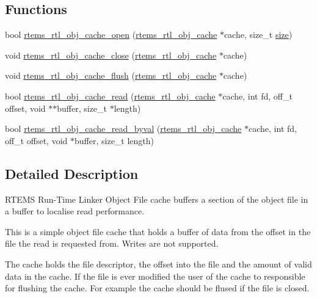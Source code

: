 \subsection*{Functions}
\begin{DoxyCompactItemize}
\item 
bool \mbox{\hyperlink{rtl-obj-cache_8h_a5b2951671bf88bf7b8e915dd8938b691}{rtems\+\_\+rtl\+\_\+obj\+\_\+cache\+\_\+open}} (\mbox{\hyperlink{structrtems__rtl__obj__cache}{rtems\+\_\+rtl\+\_\+obj\+\_\+cache}} $\ast$cache, size\+\_\+t \mbox{\hyperlink{sun4u_2tte_8h_a245260f6f74972558f61b85227df5aae}{size}})
\item 
void \mbox{\hyperlink{rtl-obj-cache_8h_af823408cc02aeceb7ab687c7d818ad1a}{rtems\+\_\+rtl\+\_\+obj\+\_\+cache\+\_\+close}} (\mbox{\hyperlink{structrtems__rtl__obj__cache}{rtems\+\_\+rtl\+\_\+obj\+\_\+cache}} $\ast$cache)
\item 
void \mbox{\hyperlink{rtl-obj-cache_8h_a111b8cc86622e49926e5267d2be870e7}{rtems\+\_\+rtl\+\_\+obj\+\_\+cache\+\_\+flush}} (\mbox{\hyperlink{structrtems__rtl__obj__cache}{rtems\+\_\+rtl\+\_\+obj\+\_\+cache}} $\ast$cache)
\item 
bool \mbox{\hyperlink{rtl-obj-cache_8h_adad604773572de631e48629ce4a7e212}{rtems\+\_\+rtl\+\_\+obj\+\_\+cache\+\_\+read}} (\mbox{\hyperlink{structrtems__rtl__obj__cache}{rtems\+\_\+rtl\+\_\+obj\+\_\+cache}} $\ast$cache, int fd, off\+\_\+t offset, void $\ast$$\ast$buffer, size\+\_\+t $\ast$length)
\item 
bool \mbox{\hyperlink{rtl-obj-cache_8h_a80432d8deca613a70eb9fa3c8ae017c1}{rtems\+\_\+rtl\+\_\+obj\+\_\+cache\+\_\+read\+\_\+byval}} (\mbox{\hyperlink{structrtems__rtl__obj__cache}{rtems\+\_\+rtl\+\_\+obj\+\_\+cache}} $\ast$cache, int fd, off\+\_\+t offset, void $\ast$buffer, size\+\_\+t length)
\end{DoxyCompactItemize}


\subsection{Detailed Description}
R\+T\+E\+MS Run-\/\+Time Linker Object File cache buffers a section of the object file in a buffer to localise read performance. 

This is a simple object file cache that holds a buffer of data from the offset in the file the read is requested from. Writes are not supported.

The cache holds the file descriptor, the offset into the file and the amount of valid data in the cache. If the file is ever modified the user of the cache to responsible for flushing the cache. For example the cache should be flused if the file is closed.

